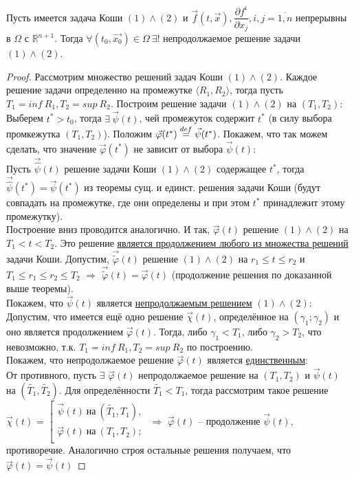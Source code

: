     \begin{theorem}
		Пусть имеется задача Коши $(1) \wedge (2)$ и $\vec{f}(t, \vec{x}), \dfrac{\partial f^i}{\partial x_j}, i, j = \overline{1, n}$ непрерывны в $\Omega$ с $\mathbb{R}^{n+1}$. Тогда $\forall (t_0, \vec{x_0}) \in \Omega \ \exists!$ непродолжаемое решение задачи $(1) \wedge (2)$.
	\end{theorem}
	\begin{proof}
	    Рассмотрим множество решений задач Коши $(1) \wedge (2)$. Каждое решение задачи определенно на промежутке $\langle R_1, R_2 \rangle$, тогда пусть $T_1 = inf\ R_1, T_2 = sup\ R_2$. Построим решение задачи $(1) \wedge (2)$ на $(T_1, T_2)$:\\
        Выберем $t^* > t_0$, тогда $\exists\ \vec{\psi}(t)$, чей промежуток содержит $t^*$ (в силу выбора промкежутка $(T_1, T_2)$). Положим $\vec{\varphi}(t^*) \stackrel{def}{=} \vec{\psi}(t^*)$. Покажем, что так можем сделать, что значение $\vec{\varphi}(t^*)$ не зависит от выбора $\vec{\psi}(t)$:\\
        Пусть $\displaystyle \vec{\hat{\psi}}(t)$ решение задачи Коши $(1) \wedge (2)$ содержащее $t^*$, тогда $\vec{\hat{\psi}}(t^*) = \vec{\psi}(t^*)$ из теоремы сущ. и единст. решения задачи Коши (будут совпадать на промежутке, где они определены и при этом $t^*$ принадлежит этому промежутку).\\ 
        Построение вниз проводится аналогично. И так, $\vec{\varphi}(t)$ решение $(1) \wedge (2)$ на $T_1 < t < T_2$. Это решение \underline{является продолжением любого из множества решений} задачи Коши. Допустим, $\vec{\widetilde{\varphi}}(t)$ решение $(1) \wedge (2)$ на $r_1 \leq t \leq r_2$ и $T_1 \leq r_1 \leq r_2 \leq T_2$ $\Rightarrow$ $\vec{\widetilde{\varphi}}(t) = \vec{\varphi}(t)$ (продолжение решения по доказанной выше теоремы). \\Покажем, что $\vec{\psi}(t)$ является \underline{непродолжаемым решением} $(1) \wedge (2)$:
        Допустим, что имеется ещё  одно решение $\vec{\chi}(t)$, определённое на $(\gamma_1; \gamma_2)$ и оно является продолжением $\vec{\varphi}(t)$. Тогда, либо $\gamma_1 < T_1$, либо $\gamma_2 > T_2$, что невозможно, т.к. $T_1 = inf\ R_1, T_2 = sup\ R_2$ по построению. \\
        Покажем, что непродолжаемое решение $\vec{\varphi}(t)$ является \underline{единственным}:\\
        От противного, пусть $\exists$ $\vec{\varphi}(t)$ непродолжаемое решение на $(T_1, T_2)$ и $\vec{\psi}(t)$ на $(\widetilde{T_1}, \widetilde{T_2})$. Для определённости $\widetilde{T_1} < T_1$, тогда рассмотрим такое решение
        $\vec{\chi}(t)$ = 
        $\left[ 
            \begin{gathered} 
                \vec{\psi}(t)\ \text{на}\ (\widetilde{T_1}, T_1), \\ 
                \vec{\varphi}(t)\ \text{на}\ (T_1, T_2); \\ 
            \end{gathered} 
        \right.$
        $\Rightarrow$ $\vec{\varphi}(t)$  -- продолжение $\vec{\psi}(t)$, противоречие. Аналогично строя остальные решения получаем, что $\vec{\varphi}(t) = \vec{\psi}(t)$ 
	\end{proof}
	
